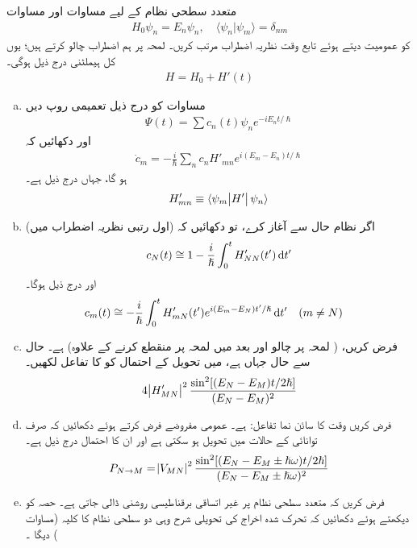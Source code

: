 متعدد سطحی نظام کے لیے مساوات  اور مساوات 
\begin{align}
	H_0\psi_n = E_n\psi_n,\quad  \langle \psi_n|\psi_m \rangle = \delta_{nm}
\end{align}
کو عمومیت دیتے ہوئے تابع وقت نظریہ اضطراب  مرتب کریں۔ لمحہ  پر ہم  اضطراب  چالو کرتے ہیں؛  یوں کل ہیملٹنی درج ذیل ہوگی۔
\begin{align}
	H = H_0 + H'(t)
\end{align}
\begin{enumerate}[a.]
\item
 مساوات   کو درج ذیل تعمیمی  روپ دیں
\begin{align}
	\Psi(t) = \sum c_n(t)\psi_ne^{-iE_nt/\hslash}
\end{align}
اور دکھائیں کہ
\begin{align}\label{مساوات_تابع_مضطرب_تفرق_شرح_مستقل}
	\dot{c}_m = -\frac{i}{\hslash}\sum_{n} c_nH'_{mn}e^{i(E_m-E_n)t/\hslash}
\end{align}
ہو گا، جہاں  درج ذیل ہے۔
\begin{align}
	H'_{mn} \equiv \langle \psi_m\abs{H'}\psi_n \rangle
\end{align}
\item
اگر نظام حال   سے  آغاز کرے،  تو دکھائیں کہ   (اول رتبی  نظریہ اضطراب میں)  
\begin{align}
	c_N(t)\cong1-\frac{i}{\hslash}\int_{0}^{t}H'_{NN}(t')\dif t'
\end{align}
اور درج ذیل ہوگا۔
\begin{align}
	c_m(t)&\cong-\frac{i}{\hslash}\int_{0}^{t}H'_{mN}(t')e^{i(E_m-E_N)t'/\hslash}\dif t'&& (m\neq N)
\end{align}
\item
 فرض کریں،  ( لمحہ  پر چالو اور بعد میں لمحہ  پر منقطع کرنے کے علاوہ)     ہے۔ حال  سے حال   جہاں   ہے، میں تحویل کے احتمال کو  کا تفاعل لکھیں۔
\begin{align}
	4\abs{H'_{MN}}^2\frac{\sin^2[(E_N-E_M)t/2\hslash]}{(E_N-E_M)^2}
\end{align}
\item
 فرض کریں  وقت کا سائن نما تفاعل:   ہے۔ عمومی مفروضے فرض کرتے ہوئے دکھائیں کہ صرف توانائی  کے حالات میں تحویل ہو سکتی ہے اور ان کا احتمال درج ذیل ہے۔
\begin{align}
	P_{N\to M} = \abs{V_{MN}}^2\frac{\sin^2[(E_N-E_M\pm\hslash\omega)t/2\hslash]}{(E_N-E_M\pm\hslash\omega)^2}
\end{align}
\item
 فرض کریں کہ  متعدد سطحی نظام پر غیر اتساقی برقناطیسی روشنی ڈالی جاتی ہے۔ حصہ    کو دیکھتے ہوئے دکھائیں کہ تحرک شدہ اخراج کی تحویلی شرح وہی  دو سطحی نظام کا   کلیہ  (مساوات )   دیگا ۔
 \end{enumerate}
